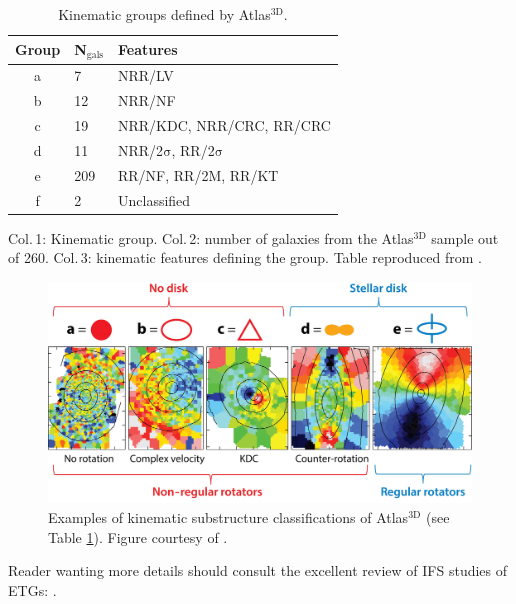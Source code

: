 	\begin{table}
		\centering
	\begin{threeparttable}
		\caption{Kinematic groups defined by Atlas$^\text{3D}$.}
		\label{tab:KinGroups}
		\begin{tabular}{c l l}
			\hline
			\hline
			Group 	& N$_\text{gals}$ & Features \\
			\hline
			a 		& 7			& NRR/LV \\
			b 		& 12		& NRR/NF \\
			c 		& 19		& NRR/KDC, NRR/CRC, RR/CRC \\
			d 		& 11		& NRR/2$\mathrm{\sigma}$, RR/2$\mathrm{\sigma}$ \\
			e 		& 209		& RR/NF, RR/2M, RR/KT \\
			f 		& 2			& Unclassified \\
			\hline
			\hline
		\end{tabular}
		\begin{tablenotes}
		\footnotesize
		\note Col.\,1: Kinematic group. Col.\,2: number of galaxies from the Atlas$^\text{3D}$ sample out of 260. Col.\,3: kinematic features defining the group. Table reproduced from \citet{Krajnovic2011}.
		\end{tablenotes}
	\end{threeparttable}
	\end{table}

	\begin{figure}
		\centering
		\includegraphics[width=\textwidth]{introduction/substructure.jpeg}
		\caption[Examples of kinematic substructure classifications]{Examples of kinematic substructure classifications of Atlas$^\text{3D}$ (see Table \ref{tab:KinGroups}). Figure courtesy of \citet{Cappellari2016}.}
		\label{fig:EgSubstructure}
	\end{figure}

	Reader wanting more details should consult the excellent review of IFS studies of ETGs: \citet{Cappellari2016}. 



